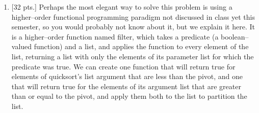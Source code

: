 \documentclass[11pt,fleqn]{article}
\begin{document}
\begin{enumerate}
\begin{info}{\textbf{\underline{Grading notes:}}}
\begin{itemize}
\begin{multicols}{4}
                      \columnbreak

                      \verb@a |&@

                    \end{multicols}

                    \vspace{-3mm}

              \item There's no penalty for extra productions.  In other words,
                    the grammar need not be minimal, so do not deduct for
                    having useless nonterminals, etc.  For example, a grammar
                    with productions like the following is fine:
                    \begin{grammar}
                      \\
                    \end{grammar}

              \item If a grammar is given that omits input redirection
                    entirely (the suggestion in the last sentence of the
                    problem description), the answer should lose 
                    for precedence and  for completeness, plus any
                    other deductions for other mistakes in the grammar.

            \end{itemize}

            \vspace{-2.5mm}

          \end{info}

          \pagebreak


    \item {[32 pts.]} Perhaps the most elegant way to solve this problem is
          using a higher--order functional programming paradigm not
          discussed in class yet this semester, so you would probably not
          know about it, but we explain it here.  It is a higher--order
          function named filter, which takes a predicate (a boolean--valued
          function) and a list, and applies the function to every element of
          the list, returning a list with only the elements of its parameter
          list for which the predicate was true.  We can create one function
          that will return true for elements of quicksort's list argument
          that are less than the pivot, and one that will return true for
          the elements of its argument list that are greater than or equal
          to the pivot, and apply them both to the list to partition the
          list.


\end{enumerate}
\end{document}
